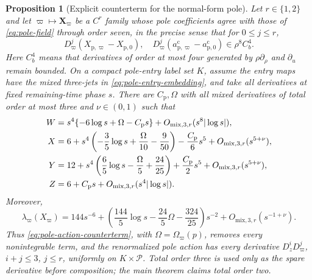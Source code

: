 \documentclass[11pt]{amsart}
\numberwithin{equation}{section}
\newtheorem{proposition}[theorem]{Proposition}
\theoremstyle{definition}
\theoremstyle{remark}
\begin{document}
\begin{proposition}[Explicit counterterm for the normal-form pole]
\label{prop:app-pole-counterterm}
Let $r\in\{1,2\}$ and let
$\varpi\mapsto\mathbf X_\varpi$ be a $C^r$ family whose pole coefficients
agree with those of \eqref{eq:pole-field} through order seven, in the
precise sense that for $0\le j\le r$,
\begin{equation}\label{eq:core-pole-order-eight-family}
 D_\varpi^j(X_{\mathrm p,\varpi}-X_{\mathrm p,0}),\quad
 D_\varpi^j(a_{\mathrm p,\varpi}^{\mathrm c}
                 -a_{\mathrm p,0}^{\mathrm c})
 \in \rho^8C_b^4.
\end{equation}
Here $C_b^4$ means that derivatives of order at most four generated by
$\rho\partial_\rho$ and $\partial_u$ remain bounded.  On a compact
pole-entry label set $K$, assume the entry maps have the mixed three-jets
in \eqref{eq:pole-entry-embedding}, and
take all derivatives at fixed remaining-time phase $s$.  There are
$C_{\mathrm p},\Omega$ with all mixed derivatives of total order at most
three and $\nu\in(0,1)$ such that
\begin{align}
 W&=s^4\{-6\log s+\Omega-C_{\mathrm p}s\}
       +O_{\mathrm{mix},3,r}(s^8|\log s|),
 \label{eq:app-mixed-pole-W}\\
 X&=6+s^4\left(-\frac35\log s+
       \frac{\Omega}{10}-\frac9{50}\right)
       -\frac{C_{\mathrm p}}{6}s^5
       +O_{\mathrm{mix},3,r}(s^{5+\nu}),\notag\\
 Y&=12+s^4\left(\frac65\log s-
       \frac{\Omega}{5}+\frac{24}{25}\right)
       +\frac{C_{\mathrm p}}{2}s^5
       +O_{\mathrm{mix},3,r}(s^{5+\nu}),
 \label{eq:app-mixed-pole-XY}\\
 Z&=6+C_{\mathrm p}s+O_{\mathrm{mix},3,r}(s^4|\log s|).\notag
\end{align}
Moreover,
\begin{equation}\label{eq:app-pole-density}
 \lambda_\varpi(X_\varpi)
 =144s^{-6}
 +\left(\frac{144}{5}\log s-\frac{24}{5}\Omega
       -\frac{324}{25}\right)s^{-2}
 +O_{\mathrm{mix},3,r}(s^{-1+\nu}).
\end{equation}
Thus \eqref{eq:pole-action-counterterm}, with
$\Omega=\Omega_\varpi(p)$, removes every nonintegrable term, and the
renormalized pole action has every derivative
$D_z^iD_\varpi^j$, $i+j\le3$, $j\le r$, uniformly on
$K\times\mathcal P$.  Total order three is used only as the spare
derivative before composition; the main theorem claims total order two.
\end{proposition}
\end{document}
